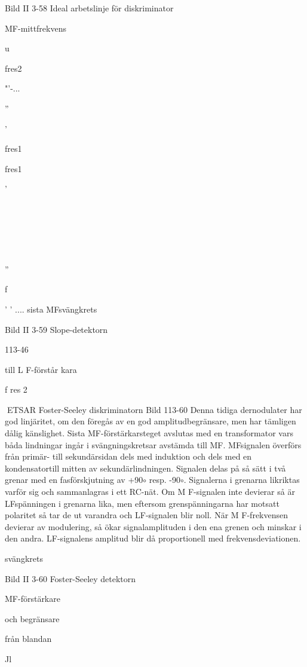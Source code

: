 \documentclass[a4paper,twoside,twocolumn,openright]{book}
\begin{document}
{{{{{{{Bild II 3-58 Ideal arbetslinje för diskriminator

MF-mittfrekvens

u

fres2

"'-...

''

'\

fres1

fres1

'

\

\

\

''

f

' ' ....
sista MFsvängkrets

Bild II 3-59 Slope-detektorn

113-46

till
L F-förstår kara

f res 2

ETSAR
Foster-Seeley diskriminatorn
Bild 113-60
Denna tidiga dernodulater har god linjäritet,
om den föregås av en god amplitudbegränsare, men har tämligen dålig känslighet.
Sista MF-förstärkarsteget avslutas med
en transformator vars båda lindningar ingår
i svängningskretsar avstämda till MF. MFsignalen överförs från primär- till sekundärsidan dels med induktion och dels med en
kondensatortill mitten av sekundärlindningen. Signalen delas på så sätt i två grenar
med en fasförskjutning av +90$\circ$ resp. -90$\circ$.
Signalerna i grenarna likriktas varför sig och
sammanlagras i ett RC-nät.
Om M F-signalen inte devierar så är LFspänningen i grenarna lika, men eftersom
grenspänningarna har motsatt polaritet så
tar de ut varandra och LF-signalen blir noll.
När M F-frekvensen devierar av modulering,
så ökar signalamplituden i den ena grenen
och minskar i den andra. LF-signalens amplitud blir då proportionell med frekvensdeviationen.

svängkrets

Bild II 3-60 Foster-Seeley detektorn

MF-förstärkare

och begränsare

från blandan~

Jl

}}}}}}}
\end{document}
